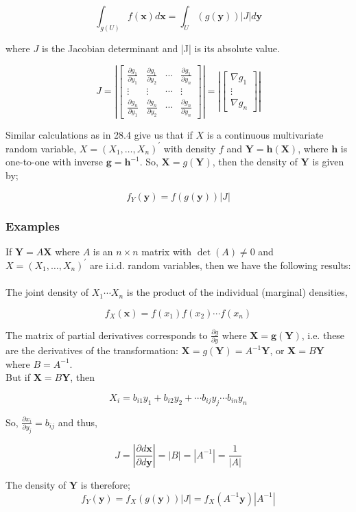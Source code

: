 \documentclass[12pt,a4paper]{article}
\theoremstyle{regla}
\theoremstyle{remark}
\theoremstyle{definition}
\theoremstyle{nonumberbreak}
\begin{document}
$$\int_{g(U)} f(\mathbf {x})d\mathbf {x}  = \int_{U}({g}(\mathbf {y}))|J|d\mathbf {y}$$

where $J$ is the Jacobian determinant and |J| is its absolute value.


$$J= 
\left|\begin{bmatrix}
\frac{\partial g_1}{\partial y_1} & \frac{\partial g_1}{\partial y_2} & \cdots &\frac{\partial g_1}{\partial y_n} \\
\vdots & \vdots & \cdots & \vdots \\
\frac{\partial g_n}{\partial y_1} & \frac{\partial g_n}{\partial y_2} & \cdots & \frac{\partial g_n}{\partial y_n} 
\end{bmatrix}\right| = 
\left|\begin{bmatrix}
\nabla g_1 \\
 \vdots \\
\nabla g_n 
\end{bmatrix}\right|$$

Similar calculations as in 28.4 give us that if $X$ is a continuous multivariate random variable, $X = (X_1, \ldots, X_n)^\prime$ with density $f$ and $\mathbf{Y}  = \mathbf{h} (\mathbf{X})$, where $\mathbf{h}$ is one-to-one with inverse $ \mathbf g= \mathbf{h}^{-1}$. So, $\mathbf{X} = g(\mathbf{Y})$, then the density of $\mathbf{Y}$ is given by;

$$f_Y(\mathbf y)   = f (g(\mathbf y)) |J|$$


\subsubsection{Examples}
\begin{xmpl}

If $\mathbf{Y} = A \mathbf X$ where $A$ is an $n \times n$ matrix with $\det(A)\neq0$ and $X = (X_1, \ldots, X_n)^\prime $ are i.i.d. random variables, then we have the following results:\\\\

The joint density of $ X_1 \cdots X_n$ is the product of the individual (marginal) densities,

$$f_X(\mathbf x)= f(x_1) f(x_2) \cdots f(x_n)$$

The matrix of partial derivatives corresponds to  $\frac{\partial g}{\partial y}$ where $\mathbf X = \mathbf g(\mathbf{Y})$, i.e. these are the derivatives of the transformation: $\mathbf X = g (\mathbf{Y}) = A^{-1}\mathbf{Y}$, or $\mathbf X = B \mathbf{Y}$ where $B = A^{-1}$.\\
 
But if $\mathbf X = B \mathbf{Y}$, then
 
$$X_i = b_{i1}y_1 + b_{i2}y_2 + \cdots b_{ij}y_j\cdots b_{in}y_n$$

So, $ \frac{\partial x_i}{\partial y_j} = b_{ij}$ and thus,
 
 $$ J =\left|\frac{\partial d\mathbf x}{\partial d\mathbf y}\right| = |B| = |A^{-1}| = \frac {1}{|A|}$$
 
 The density of $\mathbf{Y}$ is therefore;
 $$f_Y(\mathbf{y})   =  f_X(g(\mathbf{y})) |J| = f_X(A^{-1}\mathbf{y}) |A^{-1}|$$
 
 \end{xmpl}
\end{document}
